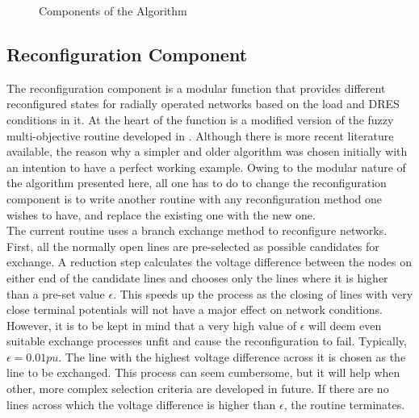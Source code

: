 \begin{figure}[!h]
\caption{Components of the Algorithm}
\end{figure}

\subsection{Reconfiguration Component}

The reconfiguration component is a modular function that provides different reconfigured states for radially operated networks based on the load and DRES conditions in it. At the heart of the function is a modified version of the fuzzy multi-objective routine developed in \cite{Das2006}. Although there is more recent literature available, the reason why a simpler and older algorithm was chosen initially with an intention to have a perfect working example. Owing to the modular nature of the algorithm presented here, all one has to do to change the reconfiguration component is to write another routine with any reconfiguration method one wishes to have, and replace the existing one with the new one.\\

The current routine uses a branch exchange method to reconfigure networks. First, all the normally open lines are pre-selected as possible candidates for exchange. A reduction step calculates the voltage difference between the nodes on either end of the candidate lines and chooses only the lines where it is higher than a pre-set value $\epsilon$. This speeds up the process as the closing of lines with very close terminal potentials will not have a major effect on network conditions. However, it is to be kept in mind that a very high value of $\epsilon$ will deem even suitable exchange processes unfit and cause the reconfiguration to fail. Typically, $\epsilon=0.01pu$. The line with the highest voltage difference across it is chosen as the line to be exchanged. This process can seem cumbersome, but it will help when other, more complex selection criteria are developed in future. If there are no lines across which the voltage difference is higher than $\epsilon$, the routine terminates.\\

